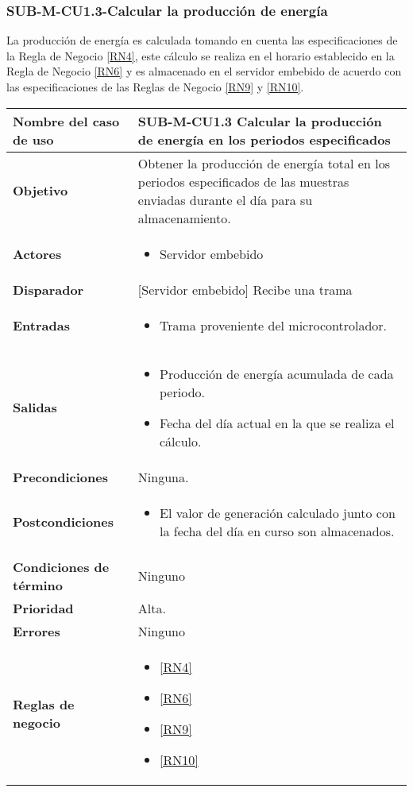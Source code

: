 \subsubsection{SUB-M-CU1.3-Calcular la producción de energía}\label{SUB-M-CU1.3}
La producción de energía es calculada tomando en cuenta las especificaciones de la Regla de Negocio \ref{RN4}, este cálculo se realiza en el horario establecido en la Regla de Negocio \ref{RN6} y es almacenado en el servidor embebido de acuerdo con las especificaciones de las Reglas de Negocio \ref{RN9} y \ref{RN10}.

\begin{longtable}{|J{5cm}|J{10.3cm}|}
	\hline
	\textbf{Nombre del caso de uso} &
		SUB-M-CU1.3 Calcular la producción de energía en los periodos especificados\\ \hline
	\textbf{Objetivo} &
		Obtener la producción de energía total en los periodos especificados de las muestras enviadas durante el día para su almacenamiento. \\ \hline
	\textbf{Actores} &
		\begin{itemize}
		    \item Servidor embebido
		\end{itemize}\\ \hline 
	\textbf{Disparador} & 
	     {[Servidor embebido]} Recibe una trama\\ \hline 
	\textbf{Entradas} & 
		\begin{itemize}
				\item Trama proveniente del microcontrolador.
		\end{itemize}\\ \hline 
	\textbf{Salidas} & 
		\begin{itemize}
			\item Producción de energía acumulada de cada periodo.
			\item Fecha del día actual en la que se realiza el cálculo.
		\end{itemize} \\ \hline
	\textbf{Precondiciones} &
		Ninguna.\\ \hline
	\textbf{Postcondiciones} &
		\begin{itemize}
			\item El valor de generación calculado junto con la fecha del día en curso son almacenados.
		\end{itemize}\\ \hline
	\textbf{Condiciones de término} & 
		Ninguno \\ \hline 
	\textbf{Prioridad} & 
		Alta. \\ \hline
	\textbf{Errores} & 
	    Ninguno
		\\ \hline
	\textbf{Reglas de negocio} & 
		\begin{itemize}
			\item \ref{RN4}
			\item \ref{RN6}
			\item \ref{RN9}
			\item \ref{RN10}
		\end{itemize} \\ \hline

\end{longtable}

